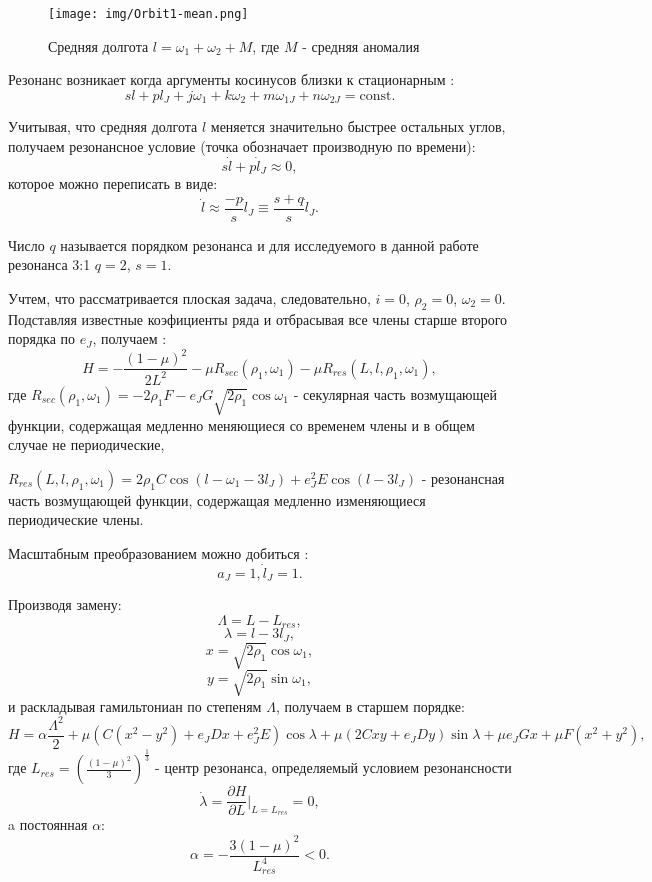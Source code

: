 \begin{figure}[htp]
\centering
\texttt{[image: img/Orbit1-mean.png]}
\caption{Средняя долгота $l = \omega_1 + \omega_2 + M$, где $M$ - средняя аномалия}
\end{figure}

Резонанс возникает когда аргументы косинусов близки к стационарным \cite{wis2}:
$$s l + p l_J + j \omega_1 + k \omega_2 + m \omega_{1J} + n \omega_{2J} = \text{const}.$$

Учитывая, что средняя долгота $l$ меняется значительно быстрее остальных углов, получаем резонансное условие (точка обозначает производную по времени):
$$s \dot l + p \dot l_J \approx 0, $$
которое можно переписать в виде:
$$\dot l \approx \frac{-p}{s} \dot l_J \equiv \frac{s+q}{s} \dot l_J.$$

Число $q$ называется порядком резонанса и для исследуемого в данной работе резонанса 3:1 $q=2$, $s=1$.

Учтем, что рассматривается плоская задача, следовательно, $i=0$, $\rho_2=0$, $\omega_2=0$. Подставляя известные коэфициенты ряда и отбрасывая все члены старше второго порядка по $e_J$, получаем \cite{wis2}:
$$H = - \frac{(1-\mu)^2}{2L^2} - \mu R_{sec}(\rho_1, \omega_1) - \mu R_{res}(L,l,\rho_1,\omega_1),$$
где $R_{sec}(\rho_1, \omega_1) = - 2 \rho_1 F - e_J G \sqrt{2 \rho_1} \cos \omega_1$ - секулярная часть возмущающей функции, содержащая медленно меняющиеся со временем члены и в общем случае не периодические, 

$R_{res}(L,l,\rho_1,\omega_1) = 2 \rho_1 C \cos(l-\omega_1-3 l_J)+e_J^2E \cos(l - 3 l_J)$ - резонансная часть возмущающей функции, содержащая медленно изменяющиеся периодические члены.

Масштабным преобразованием можно добиться  \cite{wis2}:
$$a_J=1, \dot l_J= 1 .$$

Производя замену:
$$\Lambda = L - L_{res},$$
$$\lambda = l - 3 l_J,$$
$$x = \sqrt{2 \rho_1} \cos \omega_1,$$
$$y = \sqrt{2 \rho_1} \sin \omega_1,$$
и раскладывая гамильтониан по степеням $\Lambda$, получаем в старшем порядке:
\begin{equation}
\label{Ham_res}
H = \alpha \frac{\Lambda^2}{2} + \mu \left( C(x^2-y^2)+e_J D x + e_J^2 E \right) \cos \lambda + \mu (2Cxy+e_J D y) \sin \lambda + \mu e_J G x + \mu F(x^2+y^2),
\end{equation}
где $L_{res} = \left( \frac{(1-\mu)^2}{3} \right)^\frac13$ - центр резонанса, определяемый условием резонансности 
$$
\dot \lambda = \frac{\partial H}{\partial L}|_{L=L_{res}}=0,$$
a постоянная $\alpha$: 
$$\alpha = -\frac{3(1-\mu)^2}{L_{res}^4} < 0.$$

